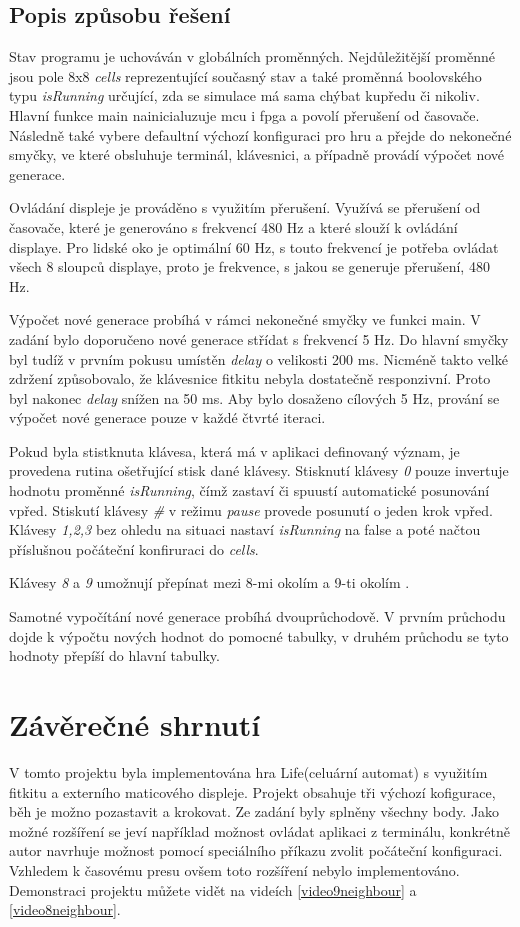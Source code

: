 \documentclass[12pt,a4paper,titlepage]{article}
\begin{document}
\subsection{Popis způsobu řešení}
Stav programu je uchováván v globálních proměnných. Nejdůležitější proměnné jsou pole 8x8 \textit{cells} reprezentující současný stav a také proměnná boolovského typu \textit{isRunning} určující, zda se simulace má sama chýbat kupředu či nikoliv. Hlavní funkce main nainicialuzuje mcu i fpga a povolí přerušení od časovače. Následně také vybere defaultní výchozí konfiguraci pro hru a přejde do nekonečné smyčky, ve které obsluhuje terminál, klávesnici, a případně provádí výpočet nové generace.

Ovládání displeje je prováděno s využitím přerušení. Využívá se přerušení od časovače, které je generováno s frekvencí 480 Hz a které slouží k ovládání displaye. Pro lidské oko je optimální 60 Hz, s touto frekvencí je potřeba ovládat všech 8 sloupců displaye, proto je frekvence, s jakou se generuje přerušení, 480 Hz.  

Výpočet nové generace probíhá v rámci nekonečné smyčky ve funkci main. V zadání bylo doporučeno nové generace střídat s frekvencí 5 Hz. Do hlavní smyčky byl tudíž v prvním pokusu umístěn \textit{delay}  o velikosti 200 ms. Nicméně takto velké zdržení způsobovalo, že klávesnice fitkitu nebyla dostatečně responzivní. Proto byl nakonec \textit{delay} snížen na 50 ms. Aby bylo dosaženo cílových 5 Hz, prování se výpočet nové generace pouze v každé čtvrté iteraci.

Pokud byla stistknuta klávesa, která má v aplikaci definovaný význam, je provedena rutina ošetřující stisk dané klávesy.
Stisknutí klávesy \textit{0} pouze invertuje hodnotu proměnné \textit{isRunning}, čímž zastaví či spuustí automatické posunování vpřed. Stiskutí klávesy \textit{\#} v režimu \textit{pause} provede posunutí o jeden krok vpřed. Klávesy \textit{1,2,3} bez ohledu na situaci nastaví \textit{isRunning} na false a poté načtou příslušnou počáteční konfiruraci do \textit{cells}.

Klávesy \textit{8} a \textit{9} umožnují přepínat mezi 8-mi okolím a 9-ti okolím .

Samotné vypočítání nové generace probíhá dvouprůchodově. V prvním průchodu dojde k výpočtu nových hodnot do pomocné tabulky, v druhém průchodu se tyto hodnoty přepíší do hlavní tabulky.

\section{Závěrečné shrnutí}
V tomto projektu byla implementována hra Life(celuární automat) s využitím fitkitu a externího maticového displeje. Projekt obsahuje tři výchozí kofigurace, běh je možno pozastavit a krokovat. Ze zadání byly splněny všechny body. Jako možné rozšíření se jeví například možnost ovládat aplikaci z terminálu, konkrétně autor navrhuje možnost pomocí speciálního příkazu zvolit počáteční konfiguraci. Vzhledem k časovému presu ovšem toto rozšíření nebylo implementováno. Demonstraci projektu můžete vidět na videích \ref{video9neighbour} a \ref{video8neighbour}.
\end{document}
